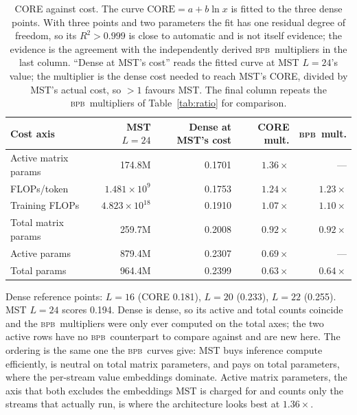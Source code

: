 \documentclass{article}
\newcommand{\bpb}{\textsc{bpb}}
\begin{document}
\begin{table}[t]
\caption{CORE against cost. The curve $\mathrm{CORE} = a + b\ln x$ is fitted to the
three dense points. With three points and two parameters the fit has one residual
degree of freedom, so its $R^2>0.999$ is close to automatic and is not itself evidence;
the evidence is the agreement with the independently derived \bpb\ multipliers in the
last column. ``Dense at MST's cost'' reads the
fitted curve at MST $L{=}24$'s value; the multiplier is the dense cost needed to reach
MST's CORE, divided by MST's actual cost, so $>1$ favours MST. The final column repeats
the \bpb\ multipliers of Table~\ref{tab:ratio} for comparison.}
\label{tab:coreladder}
\begin{center}
\begin{small}
\begin{tabular}{lrrrr}
\toprule
Cost axis & MST $L{=}24$ & Dense at MST's cost & CORE mult. & \bpb\ mult. \\
\midrule
Active matrix params  & 174.8M               & 0.1701 & $\mathbf{1.36\times}$ & --- \\
FLOPs/token           & $1.481\times10^{9}$  & 0.1753 & $\mathbf{1.24\times}$ & $1.23\times$ \\
Training FLOPs        & $4.823\times10^{18}$ & 0.1910 & $1.07\times$ & $1.10\times$ \\
Total matrix params   & 259.7M               & 0.2008 & $0.92\times$ & $0.92\times$ \\
Active params         & 879.4M               & 0.2307 & $0.69\times$ & --- \\
Total params          & 964.4M               & 0.2399 & $0.63\times$ & $0.64\times$ \\
\bottomrule
\end{tabular}
\end{small}
\end{center}
Dense reference points: $L{=}16$ (CORE 0.181), $L{=}20$ (0.233), $L{=}22$ (0.255).
MST $L{=}24$ scores 0.194. Dense is dense, so its active and total counts coincide and
the \bpb\ multipliers were only ever computed on the total axes; the two active rows have
no \bpb\ counterpart to compare against and are new here.
The ordering is the same one the \bpb\ curves give: MST buys inference compute
efficiently, is neutral on total matrix parameters, and pays on total parameters, where
the per-stream value embeddings dominate. Active matrix parameters, the axis that both
excludes the embeddings MST is charged for and counts only the streams that actually
run, is where the architecture looks best at $1.36\times$.
\end{table}
\end{document}
